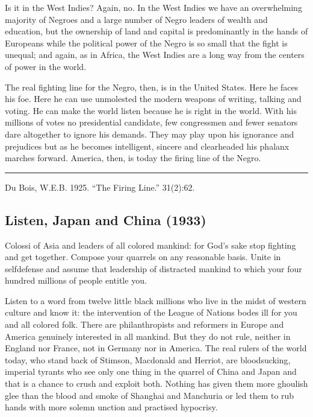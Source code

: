 \documentclass[letterpaper,10pt,english]{jupyterBook}
\begin{document}
\sphinxAtStartPar
Is it in the West Indies? Again, no. In the West Indies we have an overwhelming majority of Negroes and a large number of Negro leaders of wealth and education, but the ownership of land and capital is predominantly in the hands of Europeans while the political power of the Negro is so small that the fight is unequal; and again, as in Africa, the West Indies are a long way from the centers of power in the world.

\sphinxAtStartPar
The real fighting line for the Negro, then, is in the United States. Here he faces his foe. Here he can use unmolested the modern weapons of writing, talking and voting. He can make the world listen because he is right in the world. With his millions of votes no presidential candidate, few congressmen and fewer senators dare altogether to ignore his demands. They may play upon his ignorance and prejudices but as he becomes intelligent, sincere and clear\sphinxhyphen{}headed his phalanx marches forward. America, then, is today the firing line of the Negro.


\bigskip\hrule\bigskip


\sphinxAtStartPar
{} Du Bois, W.E.B. 1925. “The Firing Line.”  31(2):62.


\subsection{Listen, Japan and China (1933)}
\label{\detokenize{Volumes/40/01/listen_japan_and_china:listen-japan-and-china-1933}}\label{\detokenize{Volumes/40/01/listen_japan_and_china::doc}}
\sphinxAtStartPar
Colossi of Asia and leaders of all colored mankind: for God’s sake stop fighting and get together. Compose your quarrels on any reasonable basis. Unite in self\sphinxhyphen{}defense and assume that leadership of distracted mankind to which your four hundred millions of people entitle you.

\sphinxAtStartPar
Listen to a word from twelve little black millions who live in the midst of western culture and know it: the intervention of the League of Nations bodes ill for you and all colored folk. There are philanthropists and reformers in Europe and America genuinely interested in all mankind. But they do not rule, neither in England nor France, not in Germany nor in America. The real rulers of the world today, who stand back of Stimson, Macdonald and Herriot, are blood\sphinxhyphen{}sucking, imperial tyrants who see only one thing in the quarrel of China and Japan and that is a chance to crush and exploit both. Nothing has given them more ghoulish glee than the blood and smoke of Shanghai and Manchuria or led them to rub hands with more solemn unction and practised hypocrisy.
\end{document}
